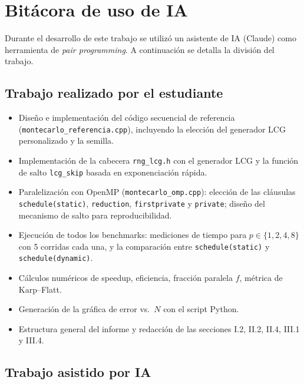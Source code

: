 \documentclass[12pt,a4paper]{article}
\begin{document}
\newpage
\appendix
\section{Bit\'acora de uso de IA}

Durante el desarrollo de este trabajo se utiliz\'o un asistente de IA (Claude) como herramienta de \emph{pair programming}. A continuaci\'on se detalla la divisi\'on del trabajo.

\subsection*{Trabajo realizado por el estudiante}

\begin{itemize}
  \item Dise\~no e implementaci\'on del c\'odigo secuencial de referencia
    (\texttt{montecarlo\_referencia.cpp}), incluyendo la elecci\'on del
    generador LCG personalizado y la semilla.
  \item Implementaci\'on de la cabecera \texttt{rng\_lcg.h} con el generador
    LCG y la funci\'on de salto \texttt{lcg\_skip} basada en
    exponenciaci\'on r\'apida.
  \item Paralelizaci\'on con OpenMP (\texttt{montecarlo\_omp.cpp}): elecci\'on
    de las cl\'ausulas \texttt{schedule(static)}, \texttt{reduction},
    \texttt{firstprivate} y \texttt{private}; dise\~no del mecanismo de
    salto para reproducibilidad.
  \item Ejecuci\'on de todos los benchmarks: mediciones de tiempo para $p\in\{1,2,4,8\}$ con 5 corridas cada una, y la comparaci\'on entre \texttt{schedule(static)} y \texttt{schedule(dynamic)}.
  \item C\'alculos num\'ericos de speedup, eficiencia, fracci\'on paralela $f$, m\'etrica de Karp--Flatt.
  \item Generaci\'on de la gr\'afica de error vs.\ $N$ con el script Python.
  \item Estructura general del informe y redacci\'on de las secciones I.2, II.2, II.4, III.1 y III.4.
\end{itemize}

\subsection*{Trabajo asistido por IA}
\end{document}
